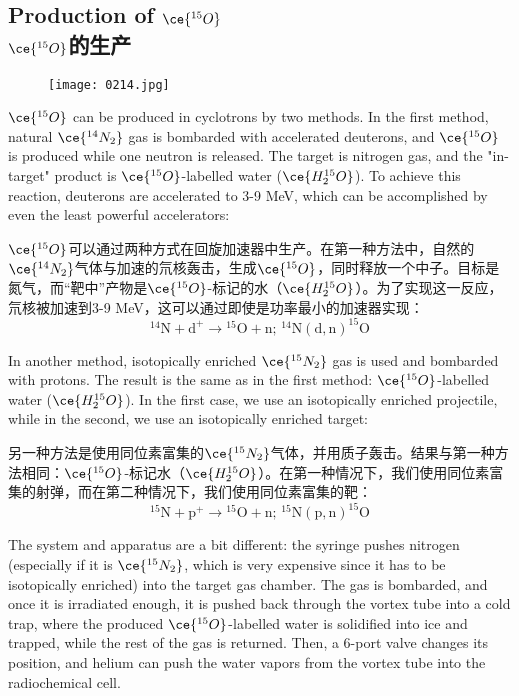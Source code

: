 \documentclass[dvipsnames, svgnames,a4paper,11pt]{article}
\begin{document}
\subsection{Production of \(\ce{^{15}O}\)\\ \(\ce{^{15}O}\)的生产}  

\begin{figure}[h]
	\centering
    \texttt{[image: 0214.jpg]}  
     \label{fig267}
\end{figure}

\(\ce{^{15}O}\) can be produced in cyclotrons by two methods. In the first method, natural \(\ce{^{14}N_2}\) gas is bombarded with accelerated deuterons, and \(\ce{^{15}O}\) is produced while one neutron is released. The target is nitrogen gas, and the "in-target" product is \(\ce{^{15}O}\)-labelled water (\(\ce{H_2^{15}O}\)). To achieve this reaction, deuterons are accelerated to 3-9 MeV, which can be accomplished by even the least powerful accelerators:

\(\ce{^{15}O}\)可以通过两种方式在回旋加速器中生产。在第一种方法中，自然的\(\ce{^{14}N_2}\)气体与加速的氘核轰击，生成\(\ce{^{15}O}\)，同时释放一个中子。目标是氮气，而“靶中”产物是\(\ce{^{15}O}\)-标记的水（\(\ce{H_2^{15}O}\)）。为了实现这一反应，氘核被加速到3-9 MeV，这可以通过即使是功率最小的加速器实现：
\[
\mathrm{^{14}N + d^{+} \rightarrow {}^{15}O + n; \, ^{14}N(d,n)^{15}O}
\]

In another method, isotopically enriched \(\ce{^{15}N_2}\) gas is used and bombarded with protons. The result is the same as in the first method: \(\ce{^{15}O}\)-labelled water (\(\ce{H_2^{15}O}\)). In the first case, we use an isotopically enriched projectile, while in the second, we use an isotopically enriched target:

另一种方法是使用同位素富集的\(\ce{^{15}N_2}\)气体，并用质子轰击。结果与第一种方法相同：\(\ce{^{15}O}\)-标记水（\(\ce{H_2^{15}O}\)）。在第一种情况下，我们使用同位素富集的射弹，而在第二种情况下，我们使用同位素富集的靶：
\[
\mathrm{^{15}N + p^{+} \rightarrow {}^{15}O + n; \, ^{15}N(p,n)^{15}O}
\]

The system and apparatus are a bit different: the syringe pushes nitrogen (especially if it is \(\ce{^{15}N_2}\), which is very expensive since it has to be isotopically enriched) into the target gas chamber. The gas is bombarded, and once it is irradiated enough, it is pushed back through the vortex tube into a cold trap, where the produced \(\ce{^{15}O}\)-labelled water is solidified into ice and trapped, while the rest of the gas is returned. Then, a 6-port valve changes its position, and helium can push the water vapors from the vortex tube into the radiochemical cell.
\end{document}
